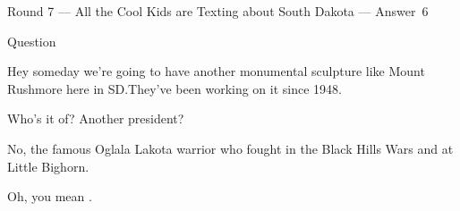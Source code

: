 \documentclass[11pt]{beamer}
\begin{document}
\begin{frame}[t]{Round 7 --- All the Cool Kids are Texting about South Dakota --- \mbox{Answer 6}}
\begin{block}{Question}

\begin{minipage}{0.9\textwidth}
\begin{mdframed}[
    roundcorner=7pt,
    backgroundcolor=black!5,
    linecolor=black!5,
    fontcolor=black,
    ignorelastdescenders]
\begin{flushleft}
{\small{}\selectfont{}
Hey someday we're going to have another monumental sculpture like Mount Rushmore here in SD.\@ They've been working on it since 1948.
}
\end{flushleft}
\end{mdframed}
\end{minipage}

\hfill{}\begin{minipage}{0.9\textwidth}
\begin{mdframed}[
    roundcorner=7pt,
    backgroundcolor=blue!80!white,
    linecolor=blue!80!white,
    fontcolor=white,
    ignorelastdescenders]
\begin{flushleft}
{\small{}\selectfont{}
Who's it of? Another president?
}
\end{flushleft}
\end{mdframed}
\end{minipage}

\begin{minipage}{0.9\textwidth}
\begin{mdframed}[
    roundcorner=7pt,
    backgroundcolor=black!5,
    linecolor=black!5,
    fontcolor=black,
    ignorelastdescenders]
\begin{flushleft}
{\small{}\selectfont{}
No, the famous Oglala Lakota warrior who fought in the Black Hills Wars and at Little Bighorn.
}
\end{flushleft}
\end{mdframed}
\end{minipage}

\hfill{}\begin{minipage}{0.9\textwidth}
\begin{mdframed}[
    roundcorner=7pt,
    backgroundcolor=blue!80!white,
    linecolor=blue!80!white,
    fontcolor=white,
    ignorelastdescenders]
\begin{flushleft}
{\small{}\selectfont{}
Oh, you mean \textunderscore{}\textunderscore{}\textunderscore{}\textunderscore{}\textunderscore{}\textunderscore{} \textunderscore{}\textunderscore{}\textunderscore{}\textunderscore{}\textunderscore{}\textunderscore{}.
}
\end{flushleft}
\end{mdframed}
\end{minipage}
\end{block}
\end{frame}
\end{document}
